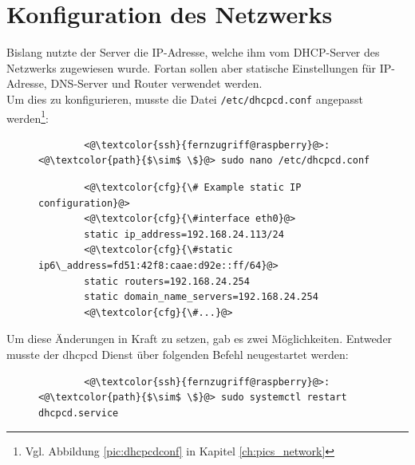 \documentclass[a4paper, 11pt]{scrartcl}
\begin{document}
\section{Konfiguration des Netzwerks}\label{ch:network}
Bislang nutzte der Server die IP-Adresse, welche ihm vom DHCP-Server des Netzwerks zugewiesen wurde. Fortan sollen aber statische Einstellungen für IP-Adresse, DNS-Server und Router
verwendet werden.
\\
Um dies zu konfigurieren, musste die Datei \lstinline[basicstyle={\small\ttfamily\color{black}}]|/etc/dhcpcd.conf| angepasst
werden\footnote{Vgl. Abbildung \ref{pic:dhcpcdconf} in Kapitel \ref{ch:pics_network}}:
\begin{figure}[H]
    \begin{mdframed}[backgroundcolor=bbg]
        \begin{lstlisting}
        <@\textcolor{ssh}{fernzugriff@raspberry}@>:<@\textcolor{path}{$\sim$ \$}@> sudo nano /etc/dhcpcd.conf
        \end{lstlisting}
    \end{mdframed}
    \label{lst:nano_dhcpcd}
\end{figure}
\begin{figure}[H]
    \begin{mdframed}[backgroundcolor=bbg]
        \begin{lstlisting}
        <@\textcolor{cfg}{\# Example static IP configuration}@>
        <@\textcolor{cfg}{\#interface eth0}@>
        static ip_address=192.168.24.113/24
        <@\textcolor{cfg}{\#static ip6\_address=fd51:42f8:caae:d92e::ff/64}@>
        static routers=192.168.24.254
        static domain_name_servers=192.168.24.254
        <@\textcolor{cfg}{\#...}@>
        \end{lstlisting}
    \end{mdframed}
    \label{lst:static_ip}
\end{figure}
Um diese Änderungen in Kraft zu setzen, gab es zwei Möglichkeiten. Entweder musste der dhcpcd Dienst über folgenden Befehl neugestartet werden:
\begin{figure}[H]
    \begin{mdframed}[backgroundcolor=bbg]
        \begin{lstlisting}
        <@\textcolor{ssh}{fernzugriff@raspberry}@>:<@\textcolor{path}{$\sim$ \$}@> sudo systemctl restart dhcpcd.service
        \end{lstlisting}
    \end{mdframed}
    \label{lst:restart_dhcpcd}
\end{figure}
\end{document}
